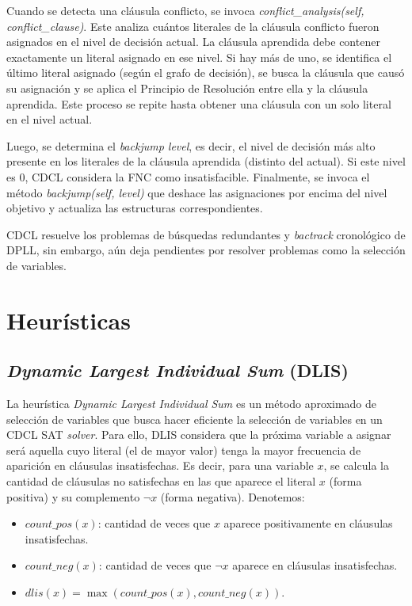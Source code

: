 Cuando se detecta una cláusula conflicto, se invoca \textit{conflict\_analysis(self, conflict\_clause)}. Este analiza cuántos literales de la cláusula conflicto fueron asignados en el nivel de decisión actual. La cláusula aprendida debe contener exactamente un literal asignado en ese nivel. Si hay más de uno, se identifica el último literal asignado (según el grafo de decisión), se busca la cláusula que causó su asignación y se aplica el Principio de Resolución entre ella y la cláusula aprendida. Este proceso se repite hasta obtener una cláusula con un solo literal en el nivel actual.

Luego, se determina el \textit{backjump level}, es decir, el nivel de decisión más alto presente en los literales de la cláusula aprendida (distinto del actual). Si este nivel es 0, CDCL considera la FNC como insatisfacible. Finalmente, se invoca el método \textit{backjump(self, level)} que deshace las asignaciones por encima del nivel objetivo y actualiza las estructuras correspondientes.

CDCL resuelve los problemas de b\'usquedas redundantes y \textit{bactrack} cronol\'ogico de DPLL, sin embargo, a\'un deja pendientes por resolver problemas como la selecci\'on de variables.


\section{Heur\'isticas}
\label{sec:heuristicas}

\subsection{\textit{Dynamic Largest Individual Sum} (DLIS)}
\label{sec}
La heur\'istica \textit{Dynamic Largest Individual Sum} es un m\'etodo aproximado de selecci\'on de variables que busca hacer eficiente la selecci\'on de variables en un CDCL SAT \textit{solver}. Para ello, DLIS considera que la pr\'oxima variable a asignar ser\'a aquella cuyo literal (el de mayor valor) tenga la mayor frecuencia de aparici\'on en cl\'ausulas insatisfechas. Es decir, para una variable $x$, se calcula la cantidad de cl\'ausulas no satisfechas en las que aparece el literal $x$ (forma positiva) y su complemento $\neg x$ (forma negativa). Denotemos:

\begin{itemize}
  \item $\textit{count\_pos}(x)$: cantidad de veces que $x$ aparece positivamente en cl\'ausulas insatisfechas.
  \item $\textit{count\_neg}(x)$: cantidad de veces que $\neg x$ aparece en cl\'ausulas insatisfechas.
  \item $\textit{dlis}(x) = \max(\textit{count\_pos}(x), \textit{count\_neg}(x))$.
\end{itemize}

